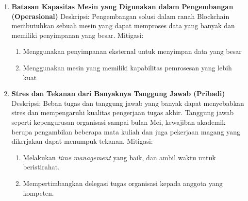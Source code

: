 \begin{enumerate}
\begin{enumerate}
  \end{enumerate}
  \item \textbf{Batasan Kapasitas Mesin yang Digunakan dalam Pengembangan (Operasional)} \newline
  Deskripsi: Pengembangan solusi dalam ranah Blockchain membutuhkan sebuah mesin yang dapat memproses data yang banyak dan memiliki penyimpanan yang besar. \newline
  Mitigasi:
  \begin{enumerate}
    \item Menggunakan penyimpanan eksternal untuk menyimpan data yang besar
    \item Menggunakan mesin yang memiliki kapabilitas pemrosesan yang lebih kuat
  \end{enumerate}
  \item \textbf{Stres dan Tekanan dari Banyaknya Tanggung Jawab (Pribadi)}  \newline
  Deskripsi: Beban tugas dan tanggung jawab yang banyak dapat menyebabkan stres dan mempengaruhi kualitas pengerjaan tugas akhir. Tanggung jawab seperti kepengurusan organisasi sampai bulan Mei, kewajiban akademik berupa pengambilan beberapa mata kuliah dan juga pekerjaan magang yang dikerjakan dapat menumpuk tekanan. \newline 
  Mitigasi:  
  \begin{enumerate}
    \item Melakukan \textit{time management} yang baik, dan ambil waktu untuk beristirahat.  
    \item Mempertimbangkan delegasi tugas organisasi kepada anggota yang kompeten.
  \end{enumerate}
\end{enumerate}